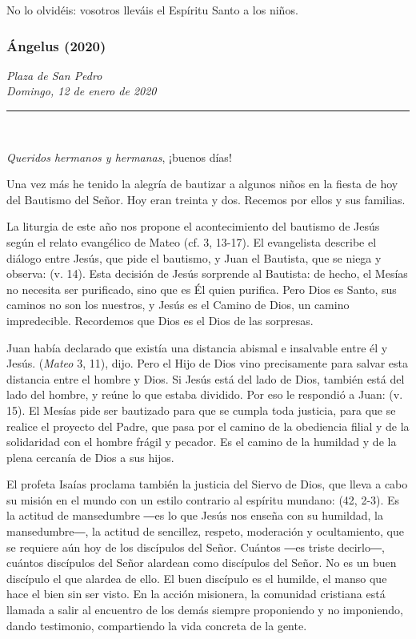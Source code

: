 No lo olvidéis: vosotros lleváis el Espíritu Santo a los niños.



\subsubsection{Ángelus (2020)} \emph{Plaza de San Pedro\\ Domingo, 12 de enero de 2020}

\begin{center}\rule{0.5\linewidth}{\linethickness}\end{center}

~

\emph{Queridos hermanos y hermanas}, ¡buenos días!

Una vez más he tenido la alegría de bautizar a algunos niños en la fiesta de hoy del Bautismo del Señor. Hoy eran treinta y dos. Recemos por ellos y sus familias.

La liturgia de este año nos propone el acontecimiento del bautismo de Jesús según el relato evangélico de Mateo (cf. 3, 13-17). El evangelista describe el diálogo entre Jesús, que pide el bautismo, y Juan el Bautista, que se niega y observa:  (v. 14). Esta decisión de Jesús sorprende al Bautista: de hecho, el Mesías no necesita ser purificado, sino que es Él quien purifica. Pero Dios es Santo, sus caminos no son los nuestros, y Jesús es el Camino de Dios, un camino impredecible. Recordemos que Dios es el Dios de las sorpresas.

Juan había declarado que existía una distancia abismal e insalvable entre él y Jesús.  (\emph{Mateo} 3, 11), dijo. Pero el Hijo de Dios vino precisamente para salvar esta distancia entre el hombre y Dios. Si Jesús está del lado de Dios, también está del lado del hombre, y reúne lo que estaba dividido. Por eso le respondió a Juan:  (v. 15). El Mesías pide ser bautizado para que se cumpla toda justicia, para que se realice el proyecto del Padre, que pasa por el camino de la obediencia filial y de la solidaridad con el hombre frágil y pecador. Es el camino de la humildad y de la plena cercanía de Dios a sus hijos.

El profeta Isaías proclama también la justicia del Siervo de Dios, que lleva a cabo su misión en el mundo con un estilo contrario al espíritu mundano:  (42, 2-3). Es la actitud de mansedumbre ―es lo que Jesús nos enseña con su humildad, la mansedumbre―, la actitud de sencillez, respeto, moderación y ocultamiento, que se requiere aún hoy de los discípulos del Señor. Cuántos ―es triste decirlo―, cuántos discípulos del Señor alardean como discípulos del Señor. No es un buen discípulo el que alardea de ello. El buen discípulo es el humilde, el manso que hace el bien sin ser visto. En la acción misionera, la comunidad cristiana está llamada a salir al encuentro de los demás siempre proponiendo y no imponiendo, dando testimonio, compartiendo la vida concreta de la gente.

